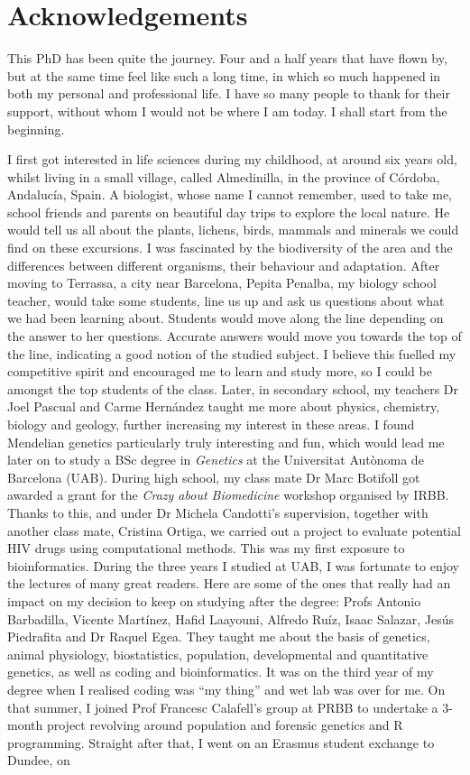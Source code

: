 \chapter*{Acknowledgements} %

This PhD has been quite the journey. Four and a half years that have flown by, but at the same time feel like such a long time, in which so much happened in both my personal and professional life. I have so many people to thank for their support, without whom I would not be where I am today. I shall start from the beginning.

I first got interested in life sciences during my childhood, at around six years old, whilst living in a small village, called Almedinilla, in the province of Córdoba, Andalucía, Spain. A biologist, whose name I cannot remember, used to take me, school friends and parents on beautiful day trips to explore the local nature. He would tell us all about the plants, lichens, birds, mammals and minerals we could find on these excursions. I was fascinated by the biodiversity of the area and the differences between different organisms, their behaviour and adaptation. After moving to Terrassa, a city near Barcelona, Pepita Penalba, my biology school teacher, would take some students, line us up and ask us questions about what we had been learning about. Students would move along the line depending on the answer to her questions. Accurate answers would move you towards the top of the line, indicating a good notion of the studied subject. I believe this fuelled my competitive spirit and encouraged me to learn and study more, so I could be amongst the top students of the class. Later, in secondary school, my teachers Dr Joel Pascual and Carme Hernández taught me more about physics, chemistry, biology and geology, further increasing my interest in these areas. I found Mendelian genetics particularly truly interesting and fun, which would lead me later on to study a BSc degree in \textit{Genetics} at the Universitat Autònoma de Barcelona (UAB). During high school, my class mate Dr Marc Botifoll got awarded a grant for the \textit{Crazy about Biomedicine} workshop organised by IRBB. Thanks to this, and under Dr Michela Candotti's supervision, together with another class mate, Cristina Ortiga, we carried out a project to evaluate potential HIV drugs using computational methods. This was my first exposure to bioinformatics. During the three years I studied at UAB, I was fortunate to enjoy the lectures of many great readers. Here are some of the ones that really had an impact on my decision to keep on studying after the degree: Profs Antonio Barbadilla, Vicente Martínez, Hafid Laayouni, Alfredo Ruíz, Isaac Salazar, Jesús Piedrafita and Dr Raquel Egea. They taught me about the basis of genetics, animal physiology, biostatistics, population, developmental and quantitative genetics, as well as coding and bioinformatics. It was on the third year of my degree when I realised coding was ``my thing'' and wet lab was over for me. On that summer, I joined Prof Francesc Calafell's group at PRBB to undertake a 3-month project revolving around population and forensic genetics and R programming. Straight after that, I went on an Erasmus student exchange to Dundee, on 